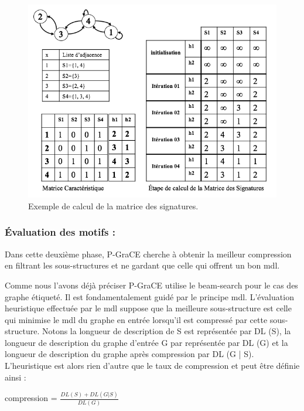 \documentclass[a4paper,oneside,12pt]{report}
\theoremstyle{definition}
\begin{document}
\begin{figure}[H]
\centering
	\includegraphics[scale=0.48]{./ressources/image/jacc.png}
	\caption[Exemple de calcul de la matrice des signatures.]{Exemple de calcul de la matrice des signatures.}
	\label{jacc}
\end{figure}
	
		
		\subsubsection{Évaluation des motifs :}
		
		 Dans cette deuxième phase, P-GraCE cherche à obtenir la meilleur compression en filtrant les sous-structures et ne gardant que celle qui offrent un bon \gls{mdl}. 
		 
Comme nous l'avons déjà préciser P-GraCE utilise le beam-search pour le cas des graphe  étiqueté. Il est fondamentalement guidé par le principe \gls{mdl}. L'évaluation heuristique effectuée par le \gls{mdl} suppose que la meilleure sous-structure est celle qui minimise le \gls{mdl} du graphe en entrée lorsqu'il est compressé par cette sous-structure. Notons la longueur de description de S est représentée par DL (S), la longueur de description du graphe d'entrée G par représentée par DL (G) et la longueur de description du graphe après compression par DL (G | S). L'heuristique est alors rien d'autre que le taux de compression et peut être définie ainsi :
		 
		\begin{center}
		compression = $\frac{DL(S)+DL(G|S)} {DL(G)}$
		\end{center}
		 
\end{document}
